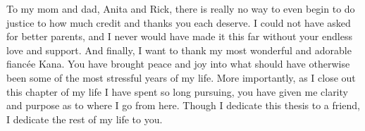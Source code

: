 To my mom and dad, Anita and Rick, there is really no way to even begin to do justice
    to how much credit and thanks you each deserve.
I could not have asked for better parents,
    and I never would have made it this far without your endless love and support.
And finally, I want to thank my most wonderful and adorable
    fianc\'ee Kana.
You have brought peace and joy into what should have otherwise been
    some of the most stressful years of my life.
More importantly, as I close out this chapter of my life I have spent so long pursuing,
    you have given me clarity and purpose as to where I go from here.
Though I dedicate this thesis to a friend,
    I dedicate the rest of my life to you.
